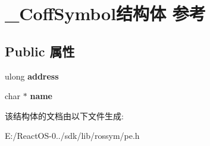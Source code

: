 \hypertarget{struct___coff_symbol}{}\section{\+\_\+\+Coff\+Symbol结构体 参考}
\label{struct___coff_symbol}
\subsection*{Public 属性}
\begin{DoxyCompactItemize}
\item 
\mbox{\label{struct___coff_symbol_a12b1c40e71e1f530d5598710eba9861a}} 
ulong {\bfseries address}
\item 
\mbox{\label{struct___coff_symbol_a832d1e4d7b60c08f43de298da74d0993}} 
char $\ast$ {\bfseries name}
\end{DoxyCompactItemize}


该结构体的文档由以下文件生成\+:\begin{DoxyCompactItemize}
\item 
E\+:/\+React\+O\+S-\/0../sdk/lib/rossym/pe.\+h\end{DoxyCompactItemize}
